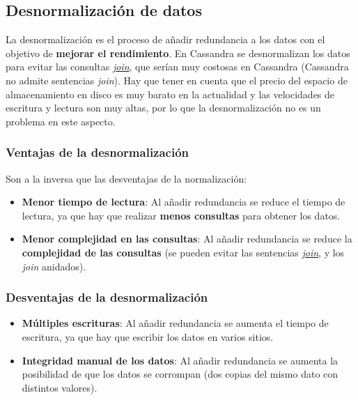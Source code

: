 \documentclass[
]{book}
\providecommand{\tightlist}{%
  \setlength{\itemsep}{0pt}\setlength{\parskip}{0pt}}
\begin{document}
\subsection{Desnormalización de datos}\label{desnormalizaciuxf3n-de-datos}

La desnormalización es el proceso de añadir redundancia a los datos con el objetivo de \textbf{mejorar el rendimiento}. En Cassandra se desnormalizan los datos para evitar las consultas \href{https://es.wikipedia.org/wiki/Sentencia_JOIN_en_SQL}{\emph{join}}, que serían muy costosas en Cassandra (Cassandra no admite sentencias \emph{join}). Hay que tener en cuenta que el precio del espacio de almacenamiento en disco es muy barato en la actualidad y las velocidades de escritura y lectura son muy altas, por lo que la desnormalización no es un problema en este aspecto.

\subsubsection{Ventajas de la desnormalización}\label{ventajas-de-la-desnormalizaciuxf3n}

Son a la inversa que las desventajas de la normalización:

\begin{itemize}
\tightlist
\item
  \textbf{Menor tiempo de lectura}: Al añadir redundancia se reduce el tiempo de lectura, ya que hay que realizar \textbf{menos consultas} para obtener los datos.
\item
  \textbf{Menor complejidad en las consultas}: Al añadir redundancia se reduce la \textbf{complejidad de las consultas} (se pueden evitar las sentencias \href{https://es.wikipedia.org/wiki/Sentencia_JOIN_en_SQL}{\emph{join}}, y los \emph{join} anidados).
\end{itemize}

\subsubsection{Desventajas de la desnormalización}\label{desventajas-de-la-desnormalizaciuxf3n}

\begin{itemize}
\tightlist
\item
  \textbf{Múltiples escrituras}: Al añadir redundancia se aumenta el tiempo de escritura, ya que hay que escribir los datos en varios sitios.
\item
  \textbf{Integridad manual de los datos}: Al añadir redundancia se aumenta la posibilidad de que los datos se corrompan (dos copias del mismo dato con distintos valores).
\end{itemize}
\end{document}
